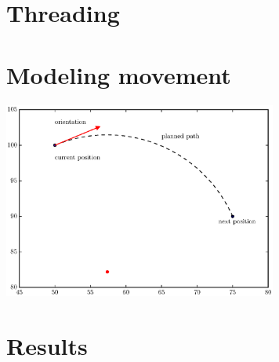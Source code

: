 \documentclass[10pt]{article}
\newenvironment{Figure}
  {\par\medskip\noindent\minipage{\linewidth}}
  {\endminipage\par\medskip}
\begin{document}
\begin{multicols}{2}
  \section*{Threading}

  \section*{Modeling movement}
  \begin{Figure}
    \includegraphics[width=9cm]{../plots/roc.eps}
     \label{fig:roc}
  \end{Figure}

  \section*{Results}
\end{multicols}
\end{document}
